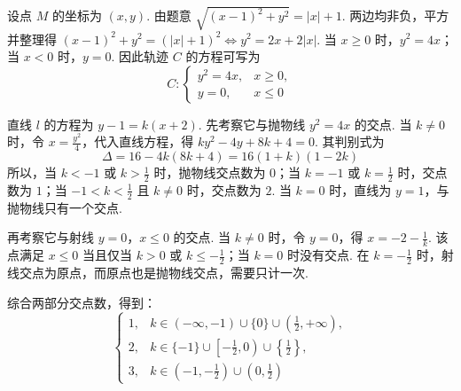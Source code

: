 \begin{solution}
设点 \(M\) 的坐标为 \((x,y)\). 由题意 \(\sqrt{(x-1)^2+y^2}=|x|+1\). 两边均非负，平方并整理得 \((x-1)^2+y^2=(|x|+1)^2\Longleftrightarrow y^2=2x+2|x|\).
当 \(x\geqslant0\) 时，\(y^2=4x\)；当 \(x<0\) 时，\(y=0\). 因此轨迹 \(C\) 的方程可写为
\[
C:\begin{cases}
y^2=4x,&x\geqslant0,\\
y=0,&x\leqslant0
\end{cases}
\]

直线 \(l\) 的方程为 \(y-1=k(x+2)\).
先考察它与抛物线 \(y^2=4x\) 的交点. 当 \(k\ne0\) 时，令 \(x=\frac{y^2}{4}\)，代入直线方程，得 \(ky^2-4y+8k+4=0\).
其判别式为
\[
\Delta=16-4k(8k+4)=16(1+k)(1-2k)
\]
所以，当 \(k<-1\) 或 \(k>\frac{1}{2}\) 时，抛物线交点数为 \(0\)；当 \(k=-1\) 或 \(k=\frac{1}{2}\) 时，交点数为 \(1\)；当 \(-1<k<\frac{1}{2}\) 且 \(k\ne0\) 时，交点数为 \(2\). 当 \(k=0\) 时，直线为 \(y=1\)，与抛物线只有一个交点.

再考察它与射线 \(y=0\)，\(x\leqslant0\) 的交点. 当 \(k\ne0\) 时，令 \(y=0\)，得 \(x=-2-\frac{1}{k}\).
该点满足 \(x\leqslant0\) 当且仅当 \(k>0\) 或 \(k\leqslant-\frac{1}{2}\)；当 \(k=0\) 时没有交点. 在 \(k=-\frac{1}{2}\) 时，射线交点为原点，而原点也是抛物线交点，需要只计一次.

综合两部分交点数，得到：
\[
\begin{cases}
1,&k\in(-\infty,-1)\cup\{0\}\cup\left(\frac{1}{2},+\infty\right),\\
2,&k\in\{-1\}\cup\left[-\frac{1}{2},0\right)\cup\left\{\frac{1}{2}\right\},\\
3,&k\in\left(-1,-\frac{1}{2}\right)\cup\left(0,\frac{1}{2}\right)
\end{cases}
\]
\end{solution}
